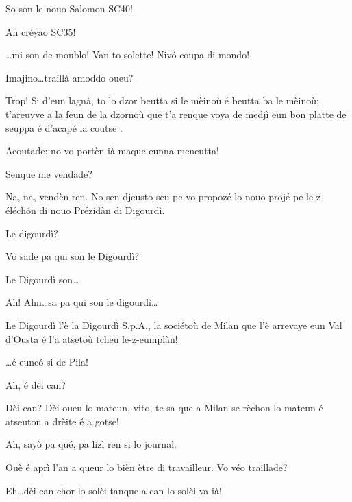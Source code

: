 \begin{drama}
\Jeanspeaks {} So son le nouo Salomon SC40!

\Dallasspeaks {} Ah créyao SC35!

\Jeanspeaks {} \ldots mi son de moublo! Van to solette! Niv\'o coupa di mondo! 

\Dallasspeaks Imajino\ldots traillà amoddo oueu?

\Jeanspeaks {} Trop! Si d'eun lagnà, to lo dzor beutta si le mèinoù é beutta ba le mèinoù; t'areuvve a la feun de la dzornoù que t'a renque voya de medjì eun bon platte de seuppa é d'acapé la coutse  . 

\Dallasspeaks Acoutade: no vo portèn ià maque eunna meneutta!

\Jeanspeaks Senque me vendade?

\Joellespeaks Na, na, vendèn ren. No sen djeusto seu pe vo propozé lo nouo projé pe le-z-éléch\'on di nouo Prézidàn di Digourdì.

\Jeanspeaks Le digourdì?

\Dallasspeaks Vo sade pa qui son le Digourdì?


\Joellespeaks Le Digourdì son\ldots


\Dallasspeaks Ah! Ahn\ldots sa pa qui son le digourdì\ldots


\Dallasspeaks Le Digourdì l'è la Digourdì S.p.A., la sociétoù de Milan que l'è arrevaye eun Val d'Ousta é l'a atsetoù tcheu le-z-eumplàn!

\Joellespeaks \ldots é eunc\'o si de Pila!

\Jeanspeaks Ah, é dèi can?

\Dallasspeaks Dèi can? Dèi oueu lo mateun, vito, te sa que a Milan se rèchon lo mateun é atseuton a drèite é a gotse!

\Jeanspeaks Ah, sayò pa qué, pa lizì ren si lo journal.

\Joellespeaks Ouè é aprì l'an a queur lo bièn ètre di travailleur. Vo véo traillade?

\Jeanspeaks  Eh\ldots dèi can chor lo solèi tanque a can lo solèi va ià!


\end{drama}
